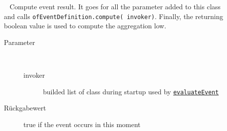 \begin{description}
\item[{\label{ontologyFramework.OFEventManagement.OFLogicalEventManagement.OFEventAggregation.compute(ontologyFramework.OFRunning.OFInvokingManager.OFBuildedListInvoker)}}]
~ Compute event result. It goes for all the parameter added to 
 this class and calls \verb!ofEventDefinition.compute( invoker)!. 
 Finally, the returning boolean value is used to compute the aggregation low.
\begin{description}
\item[Parameter] ~
\begin{description}
\item[invoker]
builded list of class during startup used by \texttt{\hyperlink{ontologyFramework.OFEventManagement.OFLogicalEventManagement.OFEventInterface.evaluateEvent(java.util.List<ontologyFramework.OFEventManagement.EventComputedData>,ontologyFramework.OFRunning.OFInvokingManager.OFBuildedListInvoker)}{evaluateEvent}}
\end{description}
\item[Rückgabewert] 
true if the event occurs in this moment
\end{description}
\end{description}
